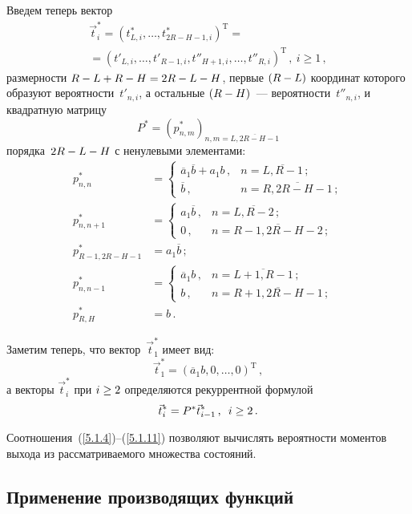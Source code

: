 \begin{multicols}{2}
Введем теперь вектор
\begin{multline*}
\vec t_i^* = (t^*_{L,i},\ldots,t^*_{2R-H-1,i})^{\mathrm{T}}
={}\\
{}= (t'_{L,i},\ldots,t'_{R-1,i}, t''_{H+1,i},\ldots,t''_{R,i})^{\mathrm{T}}\,,\
i\ge1\,,
\end{multline*}
размерности $R\hm-L\hm+R\hm-H\hm=2R\hm-L\hm-H$, первые
$(R\hm-L)$ координат которого образуют вероятности~$t'_{n,i}$, а
остальные $(R\hm-H)$~--- вероятности~$t''_{n,i}$,
и квадратную матрицу
$$
P^*=(p^*_{n,m})_{n,m=\overline{L,2R-H-1}}
$$
порядка~$2R\hm-L\hm-H$ с ненулевыми элементами:
\begin{align*}
p^*_{n,n} &= \begin{cases}
\overline{a}_1 \overline{b} + a_1 b\,,   &n=\overline{L,R-1}\,;   \\
\overline{b}\,,                &n=\overline{R,2R-H-1}\,;
\end{cases}
\\
p^*_{n,n+1} &= \begin{cases}
a_1 \overline{b}\,,        &n=\overline{L,R-2}\,;      \\
0\,,             &n=\overline{R-1,2R-H-2}\,;
\end{cases}
\\
p^*_{R-1,2R-H-1} &= a_1 \overline{b}\,;
\\
p^*_{n,n-1} &= \begin{cases}
\overline{a}_1 b\,,        &n=\overline{L+1,R-1}\,;      \\
b\,,             &n=\overline{R+1,2R-H-1}\,;
\end{cases}
\\
p^*_{R,H} &= b\,.
\end{align*}

Заметим теперь, что вектор~$\vec t^*_1$ имеет вид:
\begin{equation}
\label{5.1.10}
\vec t^*_1 = (\overline{a}_1 b,0,\ldots,0)^{\mathrm{T}}\,,
\end{equation}
а векторы $\vec t^*_i$ при $i\hm\ge 2$ определяются рекуррентной формулой
\begin{equation}
\label{5.1.11}
\vec t^*_i = P^* \vec t^*_{i-1}\,, \enskip i\ge 2\,.
\end{equation}

Соотношения~(\ref{5.1.4})--(\ref{5.1.11}) позволяют вычислять вероятности моментов выхода
из рассматриваемого множества состояний.

\subsection{Применение производящих функций}


\end{multicols}
